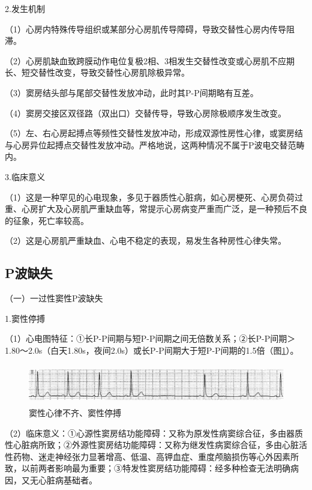 2.发生机制

（1）心房内特殊传导组织或某部分心房肌传导障碍，导致交替性心房内传导阻滞。

（2）心房肌缺血致跨膜动作电位复极2相、3相发生交替性改变或心房肌不应期长、短交替性改变，导致交替性心房肌除极异常。

（3）窦房结头部与尾部交替性发放冲动，此时其P-P间期略有互差。

（4）窦房交接区双径路（双出口）交替传导，导致心房除极顺序发生改变。

（5）左、右心房起搏点等频性交替性发放冲动，形成双源性房性心律，或窦房结与心房异位起搏点交替性发放冲动。严格地说，这两种情况不属于P波电交替范畴内。

3.临床意义

（1）这是一种罕见的心电现象，多见于器质性心脏病，如心房梗死、心房负荷过重、心房扩大及心房肌严重缺血等，常提示心房病变严重而广泛，是一种预后不良的征象，死亡率较高。

（2）这是心房肌严重缺血、心电不稳定的表现，易发生各种房性心律失常。

\protect\hypertarget{text00007.htmlux5cux23subid15}{}{}

\subsection{P波缺失}

（一）一过性窦性P波缺失

1.窦性停搏

（1）心电图特征：①长P-P间期与短P-P间期之间无倍数关系；②长P-P间期＞1.80～2.0s（白天1.80s，夜间2.0s）或长P-P间期大于短P-P间期的1.5倍（图\ref{fig1-15}）。

\begin{figure}[!htbp]
 \centering
 \includegraphics[width=5.78125in,height=0.6875in]{./images/Image00021.jpg}
 \captionsetup{justification=centering}
 \caption{窦性心律不齐、窦性停搏}
 \label{fig1-15}
  \end{figure} 

（2）临床意义：①心源性窦房结功能障碍：又称为原发性病窦综合征，多由器质性心脏病所致；②外源性窦房结功能障碍：又称为继发性病窦综合征，多由心脏活性药物、迷走神经张力显著增高、低温、高钾血症、重度颅脑损伤等心外因素所致，以前两者影响最为重要；③特发性窦房结功能障碍：经多种检查无法明确病因，又无心脏病基础者。

